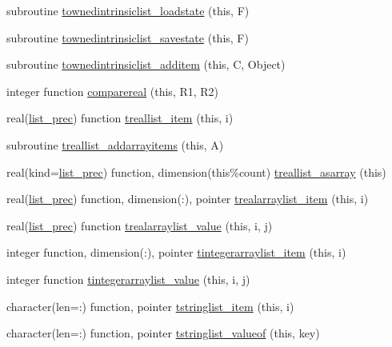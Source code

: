 \begin{DoxyCompactItemize}
\item 
subroutine \mbox{\hyperlink{namespaceobjectlists_a7b384ff8ee40c65239ebe5c1a7d239ff}{townedintrinsiclist\+\_\+loadstate}} (this, F)
\item 
subroutine \mbox{\hyperlink{namespaceobjectlists_ab634ab92805c172a136d35becaf7601b}{townedintrinsiclist\+\_\+savestate}} (this, F)
\item 
subroutine \mbox{\hyperlink{namespaceobjectlists_a8a73104aaeee3be757486f8ed7ecf1af}{townedintrinsiclist\+\_\+additem}} (this, C, Object)
\item 
integer function \mbox{\hyperlink{namespaceobjectlists_ac923fbeb64f1caebb0cd581988e43978}{comparereal}} (this, R1, R2)
\item 
real(\mbox{\hyperlink{namespaceobjectlists_a9d176bc6347eefeceba8cb520c6be81c}{list\+\_\+prec}}) function \mbox{\hyperlink{namespaceobjectlists_a7f2de098afb2605d8dccf08bd7daca10}{treallist\+\_\+item}} (this, i)
\item 
subroutine \mbox{\hyperlink{namespaceobjectlists_ae3cae7b25174f6f119f19e9c5f44dc44}{treallist\+\_\+addarrayitems}} (this, A)
\item 
real(kind=\mbox{\hyperlink{namespaceobjectlists_a9d176bc6347eefeceba8cb520c6be81c}{list\+\_\+prec}}) function, dimension(this\%count) \mbox{\hyperlink{namespaceobjectlists_a06b8548c6daa95a52c2c3d2a3fe587dc}{treallist\+\_\+asarray}} (this)
\item 
real(\mbox{\hyperlink{namespaceobjectlists_a9d176bc6347eefeceba8cb520c6be81c}{list\+\_\+prec}}) function, dimension(\+:), pointer \mbox{\hyperlink{namespaceobjectlists_afec6c1eefcdae12eeddeb762eb1e24eb}{trealarraylist\+\_\+item}} (this, i)
\item 
real(\mbox{\hyperlink{namespaceobjectlists_a9d176bc6347eefeceba8cb520c6be81c}{list\+\_\+prec}}) function \mbox{\hyperlink{namespaceobjectlists_a12e74f409aae2d6481803ca8e3348d2f}{trealarraylist\+\_\+value}} (this, i, j)
\item 
integer function, dimension(\+:), pointer \mbox{\hyperlink{namespaceobjectlists_af82a464969f9660d2a7214413b8fe757}{tintegerarraylist\+\_\+item}} (this, i)
\item 
integer function \mbox{\hyperlink{namespaceobjectlists_ab4bb3c50d65c18a798906fa87ad4a651}{tintegerarraylist\+\_\+value}} (this, i, j)
\item 
character(len=\+:) function, pointer \mbox{\hyperlink{namespaceobjectlists_ab724d2c89c530b6df64385c55bdc6377}{tstringlist\+\_\+item}} (this, i)
\item 
character(len=\+:) function, pointer \mbox{\hyperlink{namespaceobjectlists_a8003d8e93e59241bcea25f30d0b95b5a}{tstringlist\+\_\+valueof}} (this, key)

\end{DoxyCompactItemize}
